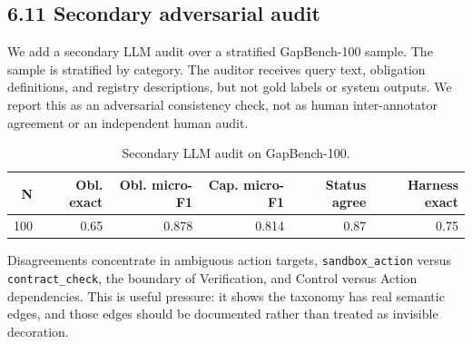 \documentclass[
  10pt,
]{article}
\begin{document}
\begin{table}[H]
\centering
\scriptsize
\caption{SWE-HarnessExec-50 provided-patch scale-up. Trace success requires failing pytest before the supplied patch and passing pytest after the patch. Cost uses declared module costs.}
\label{tab:exec50}
\end{table}

\subsection{6.11 Secondary adversarial
audit}\label{secondary-adversarial-audit}

We add a secondary LLM audit over a stratified GapBench-100 sample. The
sample is stratified by category. The auditor receives query text,
obligation definitions, and registry descriptions, but not gold labels
or system outputs. We report this as an adversarial consistency check,
not as human inter-annotator agreement or an independent human audit.

\begin{table}[H]
\centering
\small
\caption{Secondary LLM audit on GapBench-100.}
\label{tab:audit}
\begin{tabular}{rrrrrr}
\toprule
N & Obl. exact & Obl. micro-F1 & Cap. micro-F1 & Status agree & Harness exact\\
\midrule
100 & 0.65 & 0.878 & 0.814 & 0.87 & 0.75\\
\bottomrule
\end{tabular}
\end{table}

Disagreements concentrate in ambiguous action targets,
\texttt{sandbox\_action} versus \texttt{contract\_check}, the boundary
of Verification, and Control versus Action dependencies. This is useful
pressure: it shows the taxonomy has real semantic edges, and those edges
should be documented rather than treated as invisible decoration.
\end{document}
